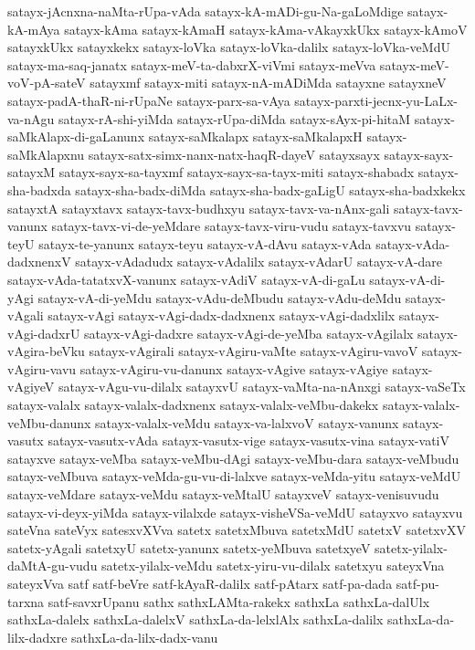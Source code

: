 {satayx-jAcnxna-naMta-rUpa-vAda
satayx-kA-mADi-gu-Na-gaLoMdige
satayx-kA-mAya
satayx-kAma
satayx-kAmaH
satayx-kAma-vAkayxkUkx
satayx-kAmoV
satayxkUkx
satayxkekx
satayx-loVka
satayx-loVka-dalilx
satayx-loVka-veMdU
satayx-ma-saq-janatx
satayx-meV-ta-dabxrX-viVmi
satayx-meVva
satayx-meV-voV-pA-sateV
satayxmf
satayx-miti
satayx-nA-mADiMda
satayxne
satayxneV
satayx-padA-thaR-ni-rUpaNe
satayx-parx-sa-vAya
satayx-parxti-jecnx-yu-LaLx-va-nAgu
satayx-rA-shi-yiMda
satayx-rUpa-diMda
satayx-sAyx-pi-hitaM
satayx-saMkAlapx-di-gaLanunx
satayx-saMkalapx
satayx-saMkalapxH
satayx-saMkAlapxnu
satayx-satx-simx-nanx-natx-haqR-dayeV
satayxsayx
satayx-sayx-satayxM
satayx-sayx-sa-tayxmf
satayx-sayx-sa-tayx-miti
satayx-shabadx
satayx-sha-badxda
satayx-sha-badx-diMda
satayx-sha-badx-gaLigU
satayx-sha-badxkekx
satayxtA
satayxtavx
satayx-tavx-budhxyu
satayx-tavx-va-nAnx-gali
satayx-tavx-vanunx
satayx-tavx-vi-de-yeMdare
satayx-tavx-viru-vudu
satayx-tavxvu
satayx-teyU
satayx-te-yanunx
satayx-teyu
satayx-vA-dAvu
satayx-vAda
satayx-vAda-dadxnenxV
satayx-vAdadudx
satayx-vAdalilx
satayx-vAdarU
satayx-vA-dare
satayx-vAda-tatatxvX-vanunx
satayx-vAdiV
satayx-vA-di-gaLu
satayx-vA-di-yAgi
satayx-vA-di-yeMdu
satayx-vAdu-deMbudu
satayx-vAdu-deMdu
satayx-vAgali
satayx-vAgi
satayx-vAgi-dadx-dadxnenx
satayx-vAgi-dadxlilx
satayx-vAgi-dadxrU
satayx-vAgi-dadxre
satayx-vAgi-de-yeMba
satayx-vAgilalx
satayx-vAgira-beVku
satayx-vAgirali
satayx-vAgiru-vaMte
satayx-vAgiru-vavoV
satayx-vAgiru-vavu
satayx-vAgiru-vu-danunx
satayx-vAgive
satayx-vAgiye
satayx-vAgiyeV
satayx-vAgu-vu-dilalx
satayxvU
satayx-vaMta-na-nAnxgi
satayx-vaSeTx
satayx-valalx
satayx-valalx-dadxnenx
satayx-valalx-veMbu-dakekx
satayx-valalx-veMbu-danunx
satayx-valalx-veMdu
satayx-va-lalxvoV
satayx-vanunx
satayx-vasutx
satayx-vasutx-vAda
satayx-vasutx-vige
satayx-vasutx-vina
satayx-vatiV
satayxve
satayx-veMba
satayx-veMbu-dAgi
satayx-veMbu-dara
satayx-veMbudu
satayx-veMbuva
satayx-veMda-gu-vu-di-lalxve
satayx-veMda-yitu
satayx-veMdU
satayx-veMdare
satayx-veMdu
satayx-veMtalU
satayxveV
satayx-venisuvudu
satayx-vi-deyx-yiMda
satayx-vilalxde
satayx-visheVSa-veMdU
satayxvo
satayxvu
sateVna
sateVyx
satesxvXVva
satetx
satetxMbuva
satetxMdU
satetxV
satetxvXV
satetx-yAgali
satetxyU
satetx-yanunx
satetx-yeMbuva
satetxyeV
satetx-yilalx-daMtA-gu-vudu
satetx-yilalx-veMdu
satetx-yiru-vu-dilalx
satetxyu
sateyxVna
sateyxVva
satf
satf-beVre
satf-kAyaR-dalilx
satf-pAtarx
satf-pa-dada
satf-pu-tarxna
satf-savxrUpanu
sathx
sathxLAMta-rakekx
sathxLa
sathxLa-dalUlx
sathxLa-dalelx
sathxLa-dalelxV
sathxLa-da-lelxlAlx
sathxLa-dalilx
sathxLa-da-lilx-dadxre
sathxLa-da-lilx-dadx-vanu
}
